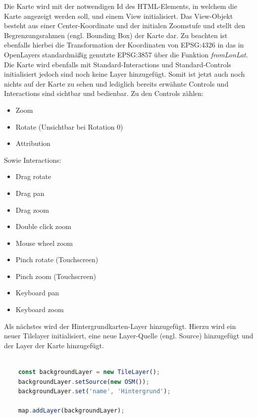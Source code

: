 Die Karte wird mit der notwendigen Id des HTML-Elements, in welchem die Karte angezeigt werden soll, und einem View initialisiert.
Das View-Objekt besteht aus einer Center-Koordinate und der initialen Zoomstufe und stellt den Begrenzungsrahmen (engl. Bounding Box) der Karte dar.
Zu beachten ist ebenfalls hierbei die Transformation der Koordinaten von EPSG:4326 in das in OpenLayers standardmäßig genutzte EPSG:3857 über die Funktion \emph{fromLonLat}.
Die Karte wird ebenfalls mit Standard-Interactions und Standard-Controls initialisiert jedoch sind noch keine Layer hinzugefügt.
Somit ist jetzt auch noch nichts auf der Karte zu sehen und lediglich bereits erwähnte Controls und Interactions sind sichtbar und bedienbar.
Zu den Controls zählen:

\begin{itemize}
	\item Zoom
	\item Rotate (Unsichtbar bei Rotation 0)
	\item Attribution
\end{itemize}

Sowie Interactions:

\begin{itemize}
	\item Drag rotate
	\item Drag pan
	\item Drag zoom
	\item Double click zoom
	\item Mouse wheel zoom
	\item Pinch rotate (Touchscreen)
	\item Pinch zoom (Touchscreen)
	\item Keyboard pan
	\item Keyboard zoom
\end{itemize}

Als nächstes wird der Hintergrundkarten-Layer hinzugefügt.
Hierzu wird ein neuer Tilelayer initialisiert, eine neue Layer-Quelle (engl. Source) hinzugefügt und der Layer der Karte hinzugefügt.

\begin{lstlisting}[language=JavaScript, caption={Erstellung der Hintergrundkarte}]
	
	const backgroundLayer = new TileLayer();
	backgroundLayer.setSource(new OSM());
	backgroundLayer.set('name', 'Hintergrund');
	
	map.addLayer(backgroundLayer);	
	
\end{lstlisting}

